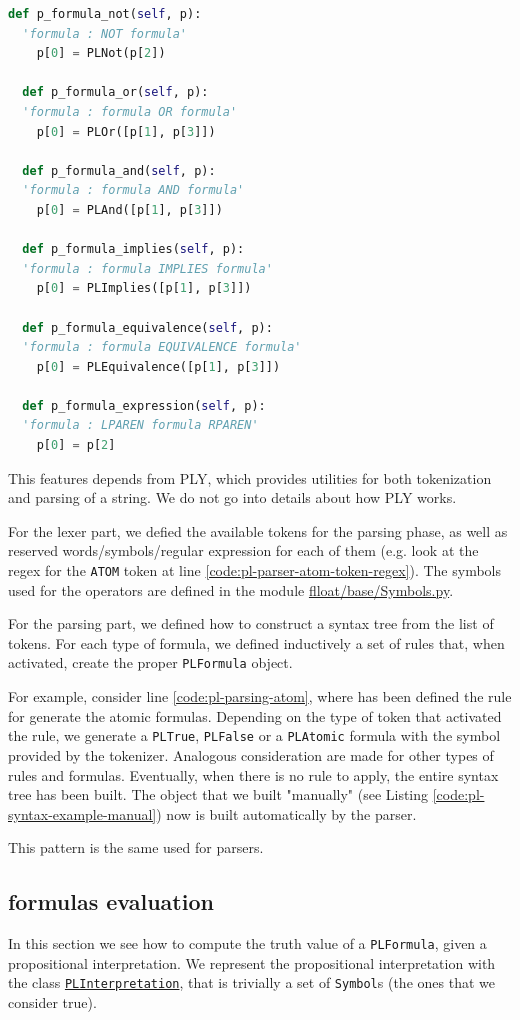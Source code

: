 \begin{lstlisting}[language=Python, style=Python, escapechar = £, label={code:PLLexer-PLParser}, caption={\texttt{PLLexer} and \texttt{PLParser}}]
  def p_formula_not(self, p):
  'formula : NOT formula'
    p[0] = PLNot(p[2])

  def p_formula_or(self, p):
  'formula : formula OR formula'
    p[0] = PLOr([p[1], p[3]])

  def p_formula_and(self, p):
  'formula : formula AND formula'
    p[0] = PLAnd([p[1], p[3]])

  def p_formula_implies(self, p):
  'formula : formula IMPLIES formula'
    p[0] = PLImplies([p[1], p[3]])

  def p_formula_equivalence(self, p):
  'formula : formula EQUIVALENCE formula'
    p[0] = PLEquivalence([p[1], p[3]])

  def p_formula_expression(self, p):
  'formula : LPAREN formula RPAREN'
    p[0] = p[2]
\end{lstlisting}
This features depends from PLY, which provides utilities for both tokenization and parsing of a string. We do not go into details about how PLY works. 

For the lexer part, we defied the available tokens for the parsing phase, as well as reserved words/symbols/regular expression for each of them (e.g. look at the regex for the \texttt{ATOM} token at line \ref{code:pl-parser-atom-token-regex}). The symbols used for the operators are defined in the module \href{https://github.com/MarcoFavorito/flloat/blob/0.1.4/flloat/base/Symbols.py}{flloat/base/Symbols.py}.

For the parsing part, we defined how to construct a syntax tree from the list of tokens. For each type of formula, we defined inductively a set of rules that, when activated, create the proper \texttt{PLFormula} object.

For example, consider line \ref{code:pl-parsing-atom}, where has been defined the rule for generate the atomic formulas. Depending on the type of token that activated the rule, we generate a \texttt{PLTrue}, \texttt{PLFalse} or a \texttt{PLAtomic} formula with the symbol provided by the tokenizer. Analogous consideration are made for other types of rules and formulas.
Eventually, when there is no rule to apply, the entire syntax tree has been built. The object that we built "manually" (see Listing \ref{code:pl-syntax-example-manual}) now is built automatically by the parser.

This pattern is the same used for \LLf parsers.

\subsection{\PL formulas evaluation}\label{sect:flloat-pl-semantics}
In this section we see how to compute the truth value of a  \texttt{PLFormula}, given a propositional interpretation. 
We represent the propositional interpretation with the class \href{https://github.com/MarcoFavorito/flloat/blob/0.1.4/flloat/semantics/pl.py#L8-L28}{\texttt{PLInterpretation}}, that is trivially a set of \texttt{Symbol}s (the ones that we consider true).


